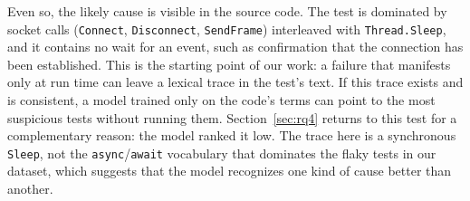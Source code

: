 Even so, the likely cause is visible in the source code. The test is dominated by socket calls (\texttt{Connect}, \texttt{Disconnect}, \texttt{SendFrame}) interleaved with \texttt{Thread.Sleep}, and it contains no wait for an event, such as confirmation that the connection has been established. This is the starting point of our work: a failure that manifests only at run time can leave a lexical trace in the test's text. If this trace exists and is consistent, a model trained only on the code's terms can point to the most suspicious tests without running them. Section~\ref{sec:rq4} returns to this test for a complementary reason: the model ranked it low. The trace here is a synchronous \texttt{Sleep}, not the \texttt{async}/\texttt{await} vocabulary that dominates the flaky tests in our dataset, which suggests that the model recognizes one kind of cause better than another. 
